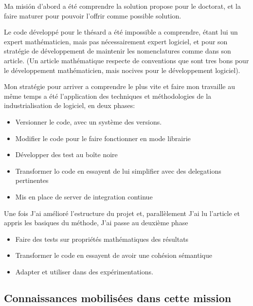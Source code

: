 \documentclass{resume} %
\begin{document}
		Ma misión d'abord a été comprendre la solution propose pour le doctorat, et la faire maturer pour pouvoir l'offrir comme possible solution.  
		
		Le code développé pour le thésard  a été impossible a comprendre, étant lui un expert mathématicien, mais pas nécessairement expert logiciel, et pour son stratégie  de développement de maintenir les nomenclatures comme dans son article. (Un article mathématique respecte de conventions que sont tres bons pour le développement mathématicien, mais nocives pour le développement logiciel). 
		
		Mon stratégie pour arriver a comprendre le plus vite et faire mon travaille au même temps a été l'application des techniques et méthodologies de la industrialisation de logiciel, en deux phases: 
		
		\begin{itemize}
				\item Versionner le code, avec un système des versions.
				\item Modifier le code pour le faire fonctionner en mode librairie 
				\item Développer des test au boîte noire
				\item Transformer lo code en essayent de lui simplifier avec des delegations pertinentes 
				\item Mis en place de server de integration continue
		\end {itemize}

		Une fois J'ai amélioré l'estructure du projet et, parallèlement J'ai lu l'article et appris les basiques du méthode, J'ai passe au deuxième phase 
	
		\begin{itemize}
				\item Faire des tests sur propriétés mathématiques des résultats   
				\item Transformer le code en essayent de avoir une cohésion sémantique 
				\item Adapter et utiliser dans des expérimentations.
		\end {itemize}

	
	\subsection {Connaissances mobilisées dans cette mission }
	
\end{document}
